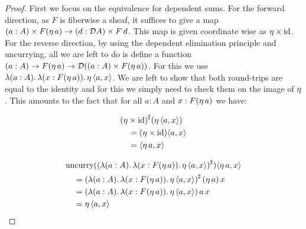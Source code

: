 \documentclass[11pt]{article}
\begin{document}
\begin{proof}
  First we focus on the equivalence for dependent sums. For the forward
  direction, as \(F\) is fiberwise a sheaf, it suffices to give a map
  \({(a : A)}\times{F(\eta\,{a})} \to {(d : \mathcal{D}{A})}\times{F\,d}\).
  This map is given coordinate wise as \({\eta}\times{\text{id}}\).
  For the reverse direction, by using the dependent elimination principle and
  uncurrying, all we are left to do is define a function
  \((a : A) \to F(\eta\,{a}) \to \mathcal{D}{({(a : A)}\times{F(\eta\,{a})})}\).
  For this we use \({\mathop{\lambda({a:A}).}{{\mathop{\lambda({x:F(\eta\,{a})}).}{\eta\,{\langle{a},{x}\rangle}}}}}\).
  We are left to show that both round-trips are equal to the identity and
  for this we simply need to check them on the image of \(\eta\).
  This amounts to the fact that for all \(a : A\) and \(x : F(\eta\,{a})\)
  we have:

  \begin{minipage}[c]{0.25\textwidth}
    \begin{align*}
      &{({\eta}\times{\text{id}})}^\sharp(\eta\,{\langle{a},{x}\rangle})
      \\
      &\quad=
        ({\eta}\times{\text{id}})\langle{a},{x}\rangle
      \\
      &\quad=
        \langle{\eta\,{a}},{x}\rangle
    \end{align*}
  \end{minipage}
  \begin{minipage}[c]{0.74\textwidth}
    \begin{align*}
      &\text{uncurry}({({\mathop{\lambda({a:A}).}{{\mathop{\lambda({x:F(\eta\,{a})}).}{\eta\,{\langle{a},{x}\rangle}}}}})}^\sharp)\langle{\eta\,{a}},{x}\rangle
      \\
      &\quad=
        {({\mathop{\lambda({a:A}).}{{\mathop{\lambda({x:F(\eta\,{a})}).}{\eta\,{\langle{a},{x}\rangle}}}}})}^\sharp\,(\eta\,{a})\,x
      \\
      &\quad=
        ({\mathop{\lambda({a:A}).}{{\mathop{\lambda({x:F(\eta\,{a})}).}{\eta\,{\langle{a},{x}\rangle}}}}})\,a\,x
      \\
      &\quad=
        \eta\,{\langle{a},{x}\rangle}
    \end{align*}
  \end{minipage}

  \hspace{0pt}


\end{proof}
\end{document}
